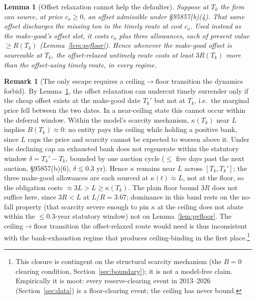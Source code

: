 \documentclass[11pt,letterpaper]{article}
\theoremstyle{plain}
\newtheorem{lemma}[theorem]{Lemma}
\theoremstyle{definition}
\newtheorem{remark}[theorem]{Remark}
\numberwithin{equation}{section}
\begin{document}
\begin{lemma}[Offset relaxation cannot help the defaulter]\label{lem:cancel} Suppose at $T_k$ the firm can source, at price $c_o\ge 0$, an offset admissible under \S95857(b)(4). That same offset discharges the missing ton in the timely
route at cost $c_o$. Used instead as the make-good's offset slot, it costs $c_o$ plus three allowances, each of present value $\ge R(T_k)$ (Lemma~\ref{lem:pvfloor}). Hence whenever the make-good offset is sourceable at $T_k$, the offset-relaxed untimely route costs at least $3R(T_k)$ more than the offset-using timely route, in every regime.
\end{lemma}

\begin{remark}[The only escape requires a ceiling$\to$floor transition the
dynamics forbid]\label{rem:nofall}
By Lemma~\ref{lem:cancel}, the offset relaxation can undercut timely surrender only if the cheap offset exists at the make-good date $T_k'$ but not at $T_k$, i.e.\ the marginal price fell between the two dates. In a near-ceiling
state this cannot occur within the deferral window. Within the model's scarcity mechanism, $\kappa(T_k)$ near $L$ implies $B(T_k)\approx 0$: no entity pays the ceiling while holding a positive bank, since $L$ caps the price and scarcity cannot be expected to worsen above it. Under the declining cap an exhausted bank does not regenerate within the statutory window $\delta=T_k'-T_k$, bounded by one auction cycle ($\le$ five days past the next auction, \S95857(b)(6), $\delta\lesssim 0.3$ yr). Hence $\kappa$ remains near $L$ across $[T_k,T_k']$; the three make-good allowances are each sourced at $\kappa(t)\approx L$, not at the floor, so the obligation costs $\approx 3L > L \ge \kappa(T_k)$. The plain floor bound $3R$ does not suffice here, since $3R<L$ at $L/R=3.67$; dominance in this band rests on the no-fall property (that scarcity severe enough to pin $\kappa$ at the ceiling does not abate within the $\le 0.3$-year statutory window) not on Lemma~\ref{lem:pvfloor}. The ceiling$\to$floor transition the offset-relaxed route would need is thus inconsistent with the bank-exhaustion regime that produces ceiling-binding in the first place.\footnote{This closure is contingent on the structural scarcity mechanism (the $B=0$ clearing condition, Section~\ref{sec:boundary}); it is not a model-free claim. Empirically it is moot: every reserve-clearing event in 2013--2026 (Section~\ref{sec:data}) is a floor-clearing event; the ceiling has never bound.}
\end{remark}
\end{document}
